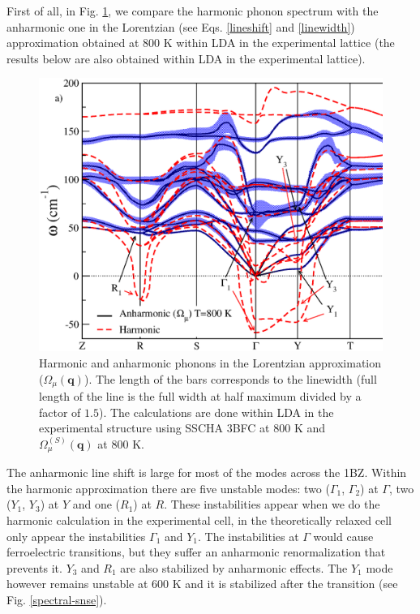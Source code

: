 First of all, in Fig. \ref{spectrum-phonon-snse}, we compare the harmonic phonon spectrum with the anharmonic one in the Lorentzian (see Eqs. \ref{lineshift} and \ref{linewidth}) approximation obtained at $800$ K within LDA in 
the experimental lattice (the results below are also obtained within LDA in the experimental lattice).
\begin{figure}[h]
\includegraphics[width=\linewidth]{Figures/spectrum-snse.eps}
\caption[Phonons in the Lorentzian approximation in SnSe.]{Harmonic and anharmonic phonons in the Lorentzian approximation ($\Omega_{\mu}(\mathbf{q})$). The length of the bars corresponds to the linewidth (full length of the line 
is the full width at half maximum divided by a factor of $1.5$). The calculations are done within LDA in the experimental structure using SSCHA 3BFC at $800$ K and $\Omega^{(S)}_{\mu}(\mathbf{q})$ at $800$ K.}
\label{spectrum-phonon-snse}
\end{figure}
The anharmonic line shift is large for most of the modes across the 1BZ. Within the harmonic approximation there are five unstable modes: two ($\Gamma_{1}$, $\Gamma_{2}$) at $\Gamma$, two ($Y_{1}$, $Y_{3}$) at $Y$ and one 
($R_{1}$) at $R$. These instabilities appear when we do the harmonic calculation in the experimental cell, in the theoretically relaxed cell only appear the instabilities $\Gamma_{1}$ and $Y_{1}$. The instabilities at $\Gamma$ would cause ferroelectric transitions\cite{skelton2016anharmonicity,hong2016electronic}, but they suffer an anharmonic renormalization that prevents it. $Y_{3}$ and $R_{1}$ are also stabilized by anharmonic effects. The $Y_{1}$ mode however remains unstable at $600$ K and it is stabilized after the transition (see Fig. \ref{spectral-snse}). \\

